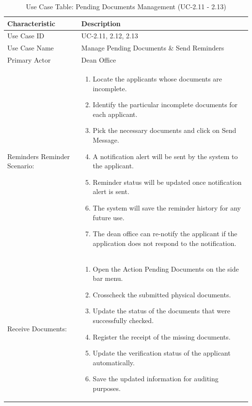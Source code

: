 \begin{table}[H]
    \centering
    \small
    \renewcommand{\arraystretch}{1.4}
    \caption{Use Case Table: Pending Documents Management (UC-2.11 - 2.13)}
    \label{tab:pending_docs_mgmt}
    
    \begin{tabularx}{\textwidth}{|l|X|}
        \hline
        \rowcolor[gray]{0.9} {Characteristic} & {Description} \\ \hline
        Use Case ID & UC-2.11, 2.12, 2.13 \\ \hline
        Use Case Name & Manage Pending Documents \& Send Reminders \\ \hline
        Primary Actor & Dean Office \\ \hline
       Reminders Reminder Scenario: &
\begin{enumerate}[nosep, leftmargin=*]
	\item Locate the applicants whose documents are incomplete.
	\item Identify the particular incomplete documents for each applicant.
	\item Pick the necessary documents and click on Send Message.
	\item A notification alert will be sent by the system to the applicant.
	\item Reminder status will be updated once notification alert is sent.
	\item The system will save the reminder history for any future use.
	\item The dean office can re-notify the applicant if the application does not respond to the notification.
\end{enumerate} \\ \hline 

Receive Documents: & 
\begin{enumerate}[nosep, leftmargin=*]
	\item Open the Action Pending Documents on the side bar menu.
	\item Crosscheck the submitted physical documents.
	\item Update the status of the documents that were successfully checked.
	\item Register the receipt of the missing documents.
	\item Update the verification status of the applicant automatically.
	\item Save the updated information for auditing purposes.
\end{enumerate} \\ \hline
    \end{tabularx}
\end{table}
\FloatBarrier